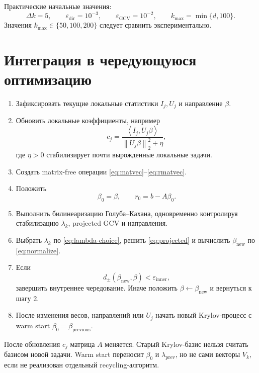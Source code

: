 \documentclass[11pt,a4paper]{article}
\newcommand{\norm}[1]{\left\lVert #1\right\rVert_2}
\newcommand{\ip}[2]{\left\langle #1,#2\right\rangle}
\begin{document}
Практические начальные значения:
\[
    \Delta k=5,
    \qquad
    \varepsilon_{\mathrm{dir}}=10^{-3},
    \qquad
    \varepsilon_{\mathrm{GCV}}=10^{-2},
    \qquad
    k_{\max}=\min\{d,100\}.
\]
Значения \(k_{\max}\in\{50,100,200\}\) следует сравнить экспериментально.

\section{Интеграция в чередующуюся оптимизацию}

\begin{enumerate}[label=\textbf{Шаг \arabic*.}]
    \item Зафиксировать текущие локальные статистики \(I_j,U_j\) и направление
    \(\beta\).

    \item Обновить локальные коэффициенты, например
    \[
        c_j
        =
        \frac{
            \ip{I_j}{U_j\beta}
        }{
            \norm{U_j\beta}^{2}+\eta
        },
    \]
    где \(\eta>0\) стабилизирует почти вырожденные локальные задачи.

    \item Создать matrix-free операции \eqref{eq:matvec}--\eqref{eq:rmatvec}.

    \item Положить
    \[
        \beta_0=\beta,
        \qquad
        r_0=b-A\beta_0.
    \]

    \item Выполнить билинеаризацию Голуба--Кахана, одновременно контролируя
    стабилизацию \(\lambda_k\), projected GCV и направления.

    \item Выбрать \(\lambda_k\) по \eqref{eq:lambda-choice}, решить
    \eqref{eq:projected} и вычислить \(\beta_{\mathrm{new}}\) по
    \eqref{eq:normalize}.

    \item Если
    \[
        d_{\pm}(\beta_{\mathrm{new}},\beta)<\varepsilon_{\mathrm{inner}},
    \]
    завершить внутреннее чередование. Иначе положить
    \(\beta\leftarrow\beta_{\mathrm{new}}\) и вернуться к шагу 2.

    \item После изменения весов, направлений или \(U_j\) начать новый
    Krylov-процесс с warm start \(\beta_0=\beta_{\mathrm{previous}}\).
\end{enumerate}

После обновления \(c_j\) матрица \(A\) меняется. Старый Krylov-базис нельзя
считать базисом новой задачи. Warm start переносит \(\beta_0\) и
\(\lambda_{\mathrm{prev}}\), но не сами векторы \(V_k\), если не реализован
отдельный recycling-алгоритм.
\end{document}
